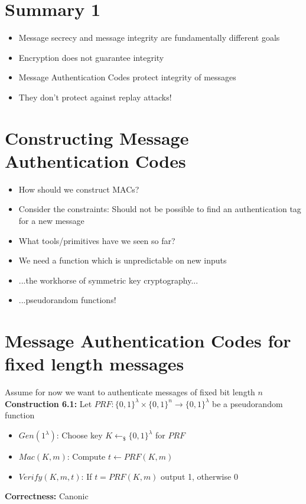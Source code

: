 \section{Summary 1}
	\begin{itemize}
		\item Message secrecy and message integrity are fundamentally different goals
		\item Encryption does not guarantee integrity
		\item Message Authentication Codes protect integrity of messages
		\item They don’t protect against replay attacks!
	\end{itemize}

\section{Constructing Message Authentication Codes}
	\begin{itemize}
		\item How should we construct MACs?
		\item Consider the constraints: Should not be possible to find an authentication tag for a new message
		\item What tools/primitives have we seen so far?
		\item We need a function which is unpredictable on new inputs
		\item ...the workhorse of symmetric key cryptography...
		\item ...pseudorandom functions!
	\end{itemize}
	
\section{Message Authentication Codes for fixed length messages}
	Assume for now we want to authenticate messages of fixed bit length $n$
	\textbf{Construction 6.1:}
	Let $PRF: \{0,1\}^{\lambda} \times \{0,1\}^{n} \rightarrow \{0,1\}^{\lambda}$ be a pseudorandom function
	\begin{itemize}
		\item $Gen(1^{\lambda})$: Choose key $K \leftarrow_{\$} \{0,1\}^{\lambda}$ for $PRF$
		\item $Mac(K,m)$: Compute $t \leftarrow PRF(K,m)$
		\item $Verify(K,m,t)$: If $t = PRF(K,m)$ output 1, otherwise 0
	\end{itemize}
	\textbf{Correctness:} Canonic

